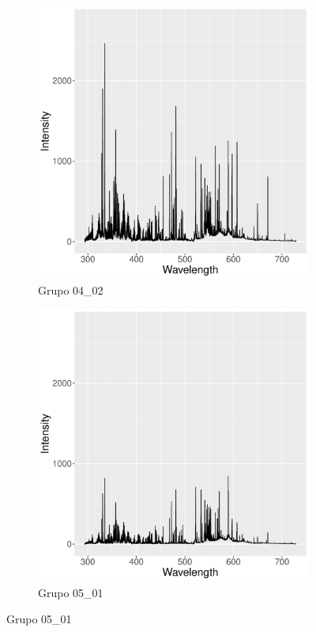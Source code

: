 \documentclass[12pt]{article}
\begin{document}
\begin{figure}[htbp]
    \centering
    \begin{subfigure}[b]{0.45\textwidth}
        \caption{Grupo 04\_02}
        \includegraphics[width=\textwidth]{median_04_02.pdf}
    \end{subfigure}
    \begin{subfigure}[b]{0.45\textwidth}
        \caption{Grupo 05\_01}
        \includegraphics[width=\textwidth]{median_05_01.pdf}

\end{subfigure}
\end{figure}
\end{document}
